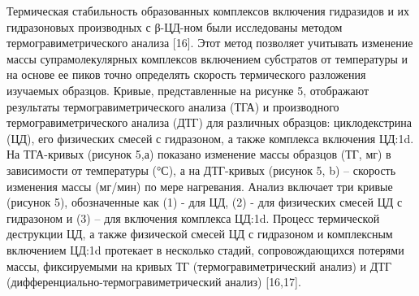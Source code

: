 \begin{multicols}{2}
Термическая стабильность образованных комплексов включения гидразидов и
их гидразоновых производных с β-ЦД-ном были исследованы методом
термогравиметрического анализа {[}16{]}. Этот метод позволяет учитывать
изменение массы супрамолекулярных комплексов включением субстратов от
температуры и на основе ее пиков точно определять скорость термического
разложения изучаемых образцов. Кривые, представленные на рисунке 5,
отображают результаты термогравиметрического анализа (ТГА) и
производного термогравиметрического анализа (ДТГ) для различных
образцов: циклодекстрина (ЦД), его физических смесей с гидразоном, а
также комплекса включения ЦД:1d. На ТГА-кривых (рисунок 5,а) показано
изменение массы образцов (ТГ, мг) в зависимости от температуры (°С), а
на ДТГ-кривых (рисунок 5, b) -- скорость изменения массы (мг/мин) по
мере нагревания. Анализ включает три кривые (рисунок 5), обозначенные
как (1) - для ЦД, (2) - для физических смесей ЦД с гидразоном и (3) --
для включения комплекса ЦД:1d. Процесс термической деструкции ЦД, а
также физической смесей ЦД с гидразоном и комплексным включением ЦД:1d
протекает в несколько стадий, сопровождающихся потерями массы,
фиксируемыми на кривых ТГ (термогравиметрический анализ) и ДТГ
(дифференциально-термогравиметрический анализ) {[}16,17{]}.
\end{multicols}

